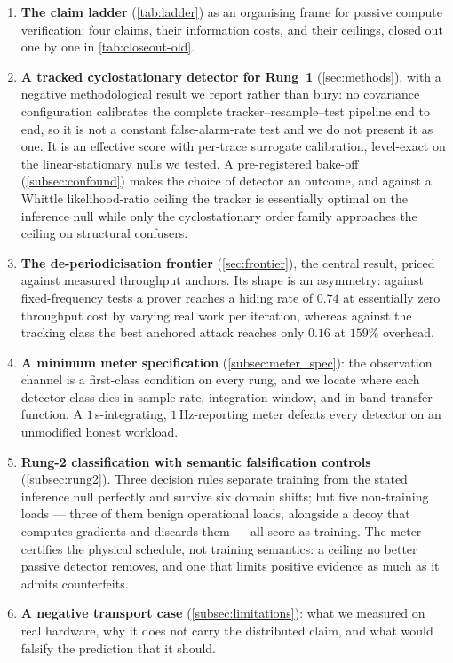 \begin{enumerate}
	\setlength{\itemsep}{1pt}
	\item \textbf{The claim ladder} (\cref{tab:ladder}) as an organising frame
	for passive compute verification: four claims, their information costs, and
	their ceilings, closed out one by one in \cref{tab:closeout-old}.
	\item \textbf{A tracked cyclostationary detector for Rung~1}
	(\cref{sec:methods}), with a negative methodological result we report
	rather than bury: no covariance configuration calibrates the complete
	tracker--resample--test pipeline end to end, so it is not a constant
	false-alarm-rate test and we do not present it as one. It is an effective
	score with per-trace surrogate calibration, level-exact on the
	linear-stationary nulls we tested. A pre-registered bake-off
	(\cref{subsec:confound}) makes the choice of detector an outcome, and against a
	Whittle likelihood-ratio ceiling the tracker is essentially optimal on the
	inference null while only the cyclostationary order family approaches the
	ceiling on structural confusers.
	\item \textbf{The de-periodicisation frontier} (\cref{sec:frontier}), the
	central result, priced against measured throughput anchors. Its shape is an
	asymmetry: against fixed-frequency tests a prover reaches a hiding rate of
	$0.74$ at essentially zero throughput cost by varying real work per
	iteration, whereas against the tracking class the best anchored attack
	reaches only $0.16$ at $159\%$ overhead.
	\item \textbf{A minimum meter specification} (\cref{subsec:meter_spec}):
	the observation channel is a first-class condition on every rung, and we
	locate where each detector class dies in sample rate, integration window,
	and in-band transfer function. A $1$\,s-integrating, $1$\,Hz-reporting meter
	defeats every detector on an unmodified honest workload.
	\item \textbf{Rung-2 classification with semantic falsification controls}
	(\cref{subsec:rung2}). Three decision rules separate training from the
	stated inference null perfectly and survive six domain shifts; but five
	non-training loads --- three of them benign operational loads, alongside a
	decoy that computes gradients and discards them --- all score as training. The
	meter certifies the physical schedule, not training semantics: a ceiling no
	better passive detector removes, and one that limits positive evidence as much
	as it admits counterfeits.
	\item \textbf{A negative transport case} (\cref{subsec:limitations}): what we
	measured on real hardware, why it does not carry the distributed claim, and
	what would falsify the prediction that it should.
\end{enumerate}

